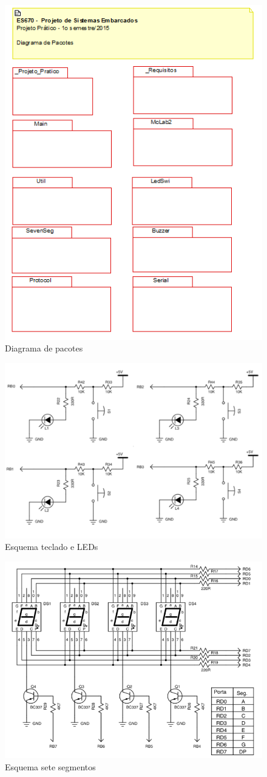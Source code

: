 \documentclass{article}
\begin{document}
\begin{figure}[H]
	\centering
	\includegraphics[width=0.7\linewidth]{pacotes}
	\caption{Diagrama de pacotes}
	\label{fig:pacotes}
\end{figure}
\begin{figure}[H]
	\centering
	\includegraphics[width=0.7\linewidth]{esq_ledswi}
	\caption{Esquema teclado e LEDs}
	\label{fig:esq_ledswi}
\end{figure}
\begin{figure}[H]
	\centering
	\includegraphics[width=0.9\linewidth]{esq_7seg}
	\caption{Esquema sete segmentos}
	\label{fig:esq_7seg}
\end{figure}
\end{document}
